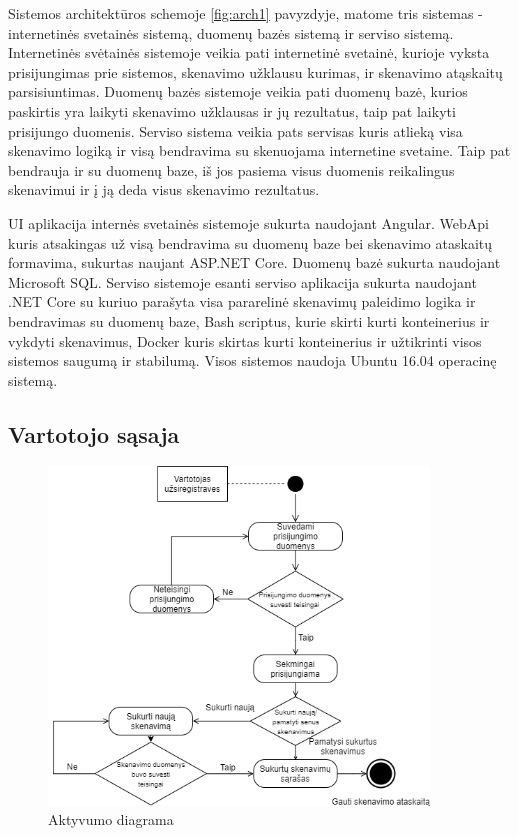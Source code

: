 \documentclass[a4paper,12pt,fleqn]{article}
\begin{document}
Sistemos architektūros schemoje \ref{fig:arch1} pavyzdyje, matome tris sistemas - internetinės svetainės sistemą, duomenų bazės sistemą ir serviso sistemą. Internetinės svėtainės sistemoje veikia pati internetinė svetainė, kurioje vyksta prisijungimas prie sistemos, skenavimo užklausu kurimas, ir skenavimo atąskaitų parsisiuntimas. Duomenų bazės sistemoje veikia pati duomenų bazė, kurios paskirtis yra laikyti skenavimo užklausas ir jų rezultatus, taip pat laikyti prisijungo duomenis. Serviso sistema veikia pats servisas kuris atlieką visa skenavimo logiką ir visą bendravima su skenuojama internetine svetaine. Taip pat bendrauja ir su duomenų baze, iš jos pasiema visus duomenis reikalingus skenavimui ir į ją deda visus skenavimo rezultatus. 

UI aplikacija internės svetainės sistemoje sukurta naudojant Angular. WebApi kuris atsakingas už visą bendravima su duomenų baze bei skenavimo ataskaitų formavima, sukurtas naujant ASP.NET Core. 
Duomenų bazė sukurta naudojant Microsoft SQL. Serviso sistemoje esanti serviso aplikacija sukurta naudojant .NET Core su kuriuo parašyta visa pararelinė skenavimų paleidimo logika ir bendravimas su duomenų baze, Bash scriptus, kurie skirti kurti konteinerius ir vykdyti skenavimus, Docker kuris skirtas kurti konteinerius ir užtikrinti visos sistemos saugumą ir stabilumą. Visos sistemos naudoja Ubuntu 16.04 operacinę sistemą. 

\subsection{Vartotojo sąsaja}

\begin{figure}[H]
	\centering
	\includegraphics[width=0.9\textwidth]{figs/Activitylt.png}
	\caption{Aktyvumo diagrama}
	\label{fig:activity}
\end{figure}
\end{document}
